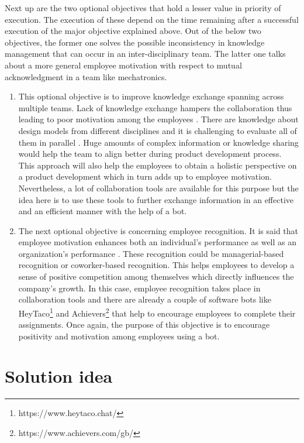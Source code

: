 Next up are the two optional objectives that hold a lesser value in priority of execution. The execution of these depend on the time remaining after a successful execution of the major objective explained above. Out of the below two objectives, the former one solves the possible inconsistency in knowledge management that can occur in an inter-disciplinary team. The latter one talks about a more general employee motivation with respect to mutual acknowledgment in a team like mechatronics.   
\begin{enumerate}
\item This optional objective is to improve knowledge exchange spanning across multiple teams. Lack of knowledge exchange hampers the collaboration thus leading to poor motivation among the employees \cite{neumann_mechatronic_nodate}. There are knowledge about design models from different disciplines and it is challenging to evaluate all of them in parallel \cite{alvarez_cabrera_towards_2010}. Huge amounts of complex information or knowledge sharing would help the team to align better during product development process. This approach will also help the employees to obtain a holistic perspective on a product
development which in turn adds up to employee motivation. Nevertheless, a lot of collaboration tools \cite{hubbard_mastering_2018} are available for this purpose but the idea here is to use these tools to further exchange information in an effective and an efficient manner with the help of a bot.

\item The next optional objective is concerning employee recognition. It is said that employee motivation enhances both an individual’s performance as well as an organization’s performance \cite{montani_employee_2020}. These recognition could be managerial-based recognition or coworker-based recognition. This helps employees to develop a sense of positive competition among themselves which directly influences the company’s growth. In this case, employee recognition takes place in collaboration tools and there are already a couple of software bots like HeyTaco\footnote{https://www.heytaco.chat/} and Achievers\footnote{https://www.achievers.com/gb/} that help to encourage employees to complete their assignments. Once again, the purpose of this objective is to encourage positivity and motivation among employees using a bot.
\end{enumerate}
 

\section{Solution idea}
\label{si}

